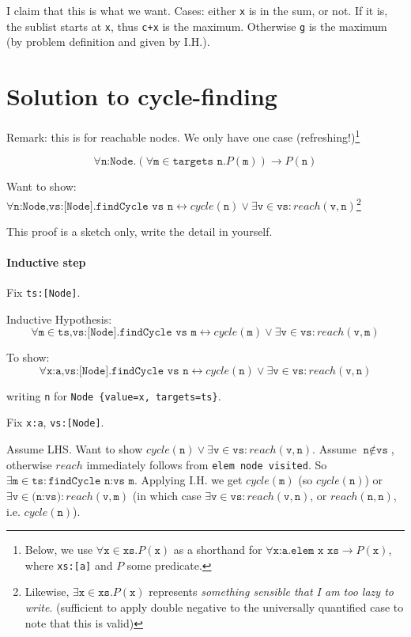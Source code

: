 \documentclass[10pt,a4paper]{article}
\newcommand{\cycle}[1]{cycle(\texttt{#1})}
\newcommand{\reach}[2]{reach(\texttt{#1},\texttt{#2})}
\begin{document}
I claim that this is what we want.
Cases: either \texttt{x} is in the sum, or not.
If it is, the sublist starts at \texttt{x}, thus \texttt{c+x} is the maximum.
Otherwise \texttt{g} is the maximum (by problem definition and given by I.H.).

\section{Solution to cycle-finding}
Remark: this is for reachable nodes. We only have one case (refreshing!)\footnote{Below, we use \( \forall\texttt{x}\in\texttt{xs.} P(\texttt{x}) \) as a shorthand for \( \forall\texttt{x:a.} \texttt{elem x xs} \rightarrow P(\texttt{x}) \), where \texttt{xs:[a]} and \(P\) some predicate.}

\[ \forall\texttt{n:Node.} (\forall\texttt{m}\in \texttt{targets n.} P(\texttt{m})) \rightarrow P(\texttt{n}) \]

Want to show: \( \forall\texttt{n:Node,vs:[Node].}\texttt{findCycle vs n} \leftrightarrow cycle(\texttt{n}) \lor \exists\texttt{v}\in\texttt{vs}: reach(\texttt{v},\texttt{n}) \)\footnote{Likewise, \( \exists\texttt{x}\in\texttt{xs.} P(\texttt{x}) \) represents \emph{something sensible that I am too lazy to write}. (sufficient to apply double negative to the universally quantified case to note that this is valid)}

This proof is a sketch only, write the detail in yourself.

\paragraph{Inductive step}
Fix \texttt{ts:[Node]}.

Inductive Hypothesis:
\[ \forall\texttt{m}\in\texttt{ts,vs:[Node].}\texttt{findCycle vs m} \leftrightarrow cycle(\texttt{m}) \lor \exists\texttt{v}\in\texttt{vs}: reach(\texttt{v},\texttt{m}) \]

To show:
\[ \forall \texttt{x:a,vs:[Node].}\texttt{findCycle vs n} \leftrightarrow \cycle n \lor \exists\texttt{v}\in\texttt{vs}: \reach v n \]

writing \texttt{n} for \texttt{Node \{value=x, targets=ts\}}.

Fix \texttt{x:a}, \texttt{vs:[Node]}.


Assume LHS. Want to show \(cycle(\texttt{n}) \lor \exists\texttt{v}\in\texttt{vs}: reach(\texttt{v},\texttt{n})\).
Assume \( \texttt{n}\notin\texttt{vs} \), otherwise \(reach\) immediately follows from \texttt{elem node visited}.
So \( \exists\texttt{m}\in\texttt{ts}: \texttt{findCycle n:vs m} \).
Applying I.H. we get \( \cycle m \) (so \(\cycle n \)) or \(\exists\texttt{v}\in\texttt{(n:vs)}: \reach v m \) (in which case \(\exists\texttt{v}\in\texttt{vs}: \reach v n \), or \(\reach n n \), i.e. \(\cycle n\)).
\end{document}
